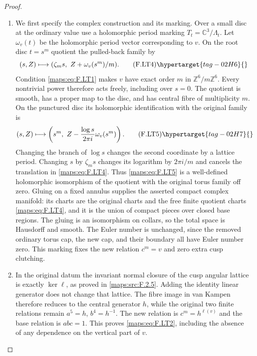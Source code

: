 \begin{proof}
\begin{enumerate}[label={$\langle1\rangle$\arabic*.}]
\item We first specify the complex construction and its marking.
Over a small disc at the ordinary value use a holomorphic
period marking
$T_t=\mathbb C^3/\Lambda_t$.
Let $\omega_v(t)$ be the holomorphic period vector
corresponding to $v$.
On the root disc $t=s^m$ quotient the pulled-back family by
\[
 (s,Z)\longmapsto
   (\zeta_m s,\ Z+\omega_v(s^m)/m).
\tag{F.LT4}\hypertarget{tag-02H6}{}\label{maps:eq:F.LT4}
\]
Condition \eqref{maps:eq:F.LT1} makes $v$ have exact order $m$
in $\mathbb Z^6/m\mathbb Z^6$.
Every nontrivial power therefore acts freely, including
over $s=0$.
The quotient is smooth, has a proper map to the disc,
and has central fibre of multiplicity $m$.
On the punctured disc its holomorphic identification with
the original family is
\[
 (s,Z)\longmapsto
 \left(s^m,\ Z-\frac{\log s}{2\pi i}\omega_v(s^m)\right).
\tag{F.LT5}\hypertarget{tag-02H7}{}\label{maps:eq:F.LT5}
\]
Changing the branch of $\log s$ changes the second
coordinate by a lattice period.
Changing $s$ by $\zeta_m s$ changes its logarithm by
$2\pi i/m$ and cancels the translation in \eqref{maps:eq:F.LT4}.
Thus \eqref{maps:eq:F.LT5} is a well-defined holomorphic isomorphism
of the quotient with the original torus family off zero.
Gluing on a fixed annulus supplies the asserted compact
complex manifold: its charts are the original charts
and the free finite quotient charts \eqref{maps:eq:F.LT4}, and it is
the union of compact pieces over closed base regions.
The gluing is an isomorphism on collars, so the total
space is Hausdorff and smooth.
The Euler number is unchanged, since the removed
ordinary torus cap, the new cap, and their boundary
all have Euler number zero.
This marking fixes the new relation $c^m=v$ and
zero extra cusp clutching.

\item In the original datum the invariant normal closure
of the cusp angular lattice is exactly $\ker\ell$,
as proved in \ref{maps:src:F.2.5}.
Adding the identity linear generator does not change
that lattice.
The fibre image in van Kampen therefore reduces to
the central generator $h$, while the original two
finite relations remain $a^5=h$, $b^4=h^{-1}$.
The new relation is $c^m=h^{\ell(v)}$ and the base
relation is $abc=1$.
This proves \eqref{maps:eq:F.LT2}, including the absence of any
dependence on the vertical part of $v$.


\end{enumerate}
\end{proof}
